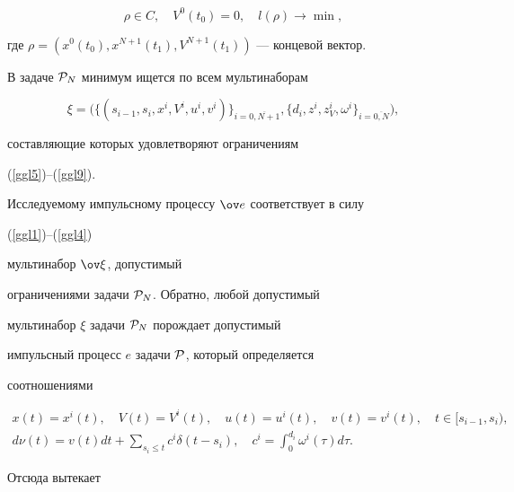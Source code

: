 %


\begin{equation} \rho\in C, \quad V^0(t_0)=0,\quad


l(\rho)\rightarrow \min,


\label{ggl9}


\end{equation}


где $\rho=(x^0(t_0), x^{N+1}(t_1),V^{N+1}(t_1))$ --- концевой вектор.





В задаче ${\cal P}_N$ минимум ищется по всем мультинаборам


$$


\xi=\Big(\{(s_{i-1},s_i,x^i,V^i,u^i,v^i)\}_{i=\overline{0,N+1}},


\{d_i,z^i,z_V^i, \omega^i\}_{i=\overline{0,N}}\Big),


$$


составляющие которых удовлетворяют ограничениям


(\ref{ggl5})--(\ref{ggl9}).





Исследуемому импульсному процессу $\ov e$ соответствует в силу


(\ref{ggl1})--(\ref{ggl4})


мультинабор $\ov \xi$, допустимый


ограничениями задачи ${\cal P}_N$. Обратно, любой допустимый


мультинабор $\xi$ задачи ${\cal P}_N$ порождает допустимый


импульсный процесс $e$ задачи ${\cal P}$, который определяется


соотношениями


\begin{gather*}


x(t)=x^i(t),\quad V(t)=V^i(t),\quad


u(t)=u^i(t),\quad v(t)=v^i(t),\quad t\in [s_{i-1},s_i),\\


%


d\nu(t)=v(t)dt+\sum_{s_i\leq t}c^i\delta(t-s_i),\quad


c^i=\int_0^{d_i}\omega^i(\tau)d\tau.


\end{gather*}


Отсюда вытекает





